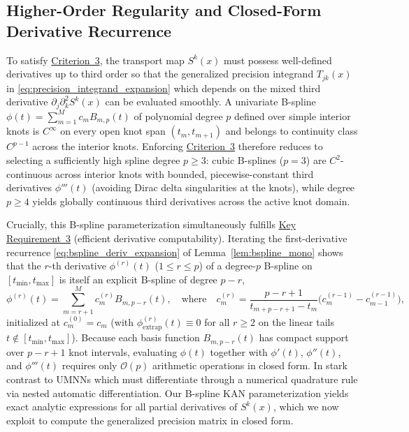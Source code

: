 \documentclass[11pt,a4paper]{article}
\theoremstyle{plain}
\theoremstyle{definition}
\theoremstyle{remark}
\begin{document}
\subsection{Higher-Order Regularity and Closed-Form Derivative Recurrence}
\label{subsec:regularity_and_derivatives}

To satisfy \hyperref[crit:c3_smoothness]{Criterion~3}, the transport map $S^k(x)$ must possess well-defined derivatives up to third order so that the generalized precision integrand $T_{jk}(x)$ in \eqref{eq:precision_integrand_expansion} which depends on the mixed third derivative $\partial_j \partial_k^2 S^k(x)$ can be evaluated smoothly. A univariate B-spline $\phi(t) = \sum_{m=1}^M c_m B_{m, p}(t)$ of polynomial degree $p$ defined over simple interior knots is $C^\infty$ on every open knot span $(t_m, t_{m+1})$ and belongs to continuity class $C^{p-1}$ across the interior knots. Enforcing \hyperref[crit:c3_smoothness]{Criterion~3} therefore reduces to selecting a sufficiently high spline degree $p \ge 3$: cubic B-splines ($p = 3$) are $C^2$-continuous across interior knots with bounded, piecewise-constant third derivatives $\phi'''(t)$ (avoiding Dirac delta singularities at the knots), while degree $p \ge 4$ yields globally continuous third derivatives across the active knot domain.


Crucially, this B-spline parameterization simultaneously fulfills \hyperref[req:key_requirement_3]{Key Requirement~3} (efficient derivative computability). Iterating the first-derivative recurrence \eqref{eq:bspline_deriv_expansion} of Lemma~\ref{lem:bspline_mono} shows that the $r$-th derivative $\phi^{(r)}(t)$ ($1 \le r \le p$) of a degree-$p$ B-spline on $[t_{\min}, t_{\max}]$ is itself an explicit B-spline of degree $p - r$,
\begin{equation}
    \phi^{(r)}(t) = \sum_{m=r+1}^M c_m^{(r)} B_{m, p-r}(t), \quad \text{where} \quad c_m^{(r)} = \frac{p - r + 1}{t_{m+p-r+1} - t_m}\Big( c_m^{(r-1)} - c_{m-1}^{(r-1)} \Big),
    \label{eq:higher_order_bspline_recurrence}
\end{equation}
initialized at $c_m^{(0)} = c_m$ (with $\phi^{(r)}_{\text{extrap}}(t) \equiv 0$ for all $r \ge 2$ on the linear tails $t \notin [t_{\min}, t_{\max}]$). Because each basis function $B_{m, p-r}(t)$ has compact support over $p - r + 1$ knot intervals, evaluating $\phi(t)$ together with $\phi'(t)$, $\phi''(t)$, and $\phi'''(t)$ requires only $\mathcal{O}(p)$ arithmetic operations in closed form. In stark contrast to UMNNs which must differentiate through a numerical quadrature rule via nested automatic differentiation. Our B-spline KAN parameterization yields exact analytic expressions for all partial derivatives of $S^k(x)$, which we now exploit to compute the generalized precision matrix in closed form.
\end{document}

